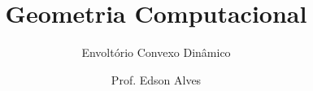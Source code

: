 \title{Geometria Computacional}
\subtitle{Envoltório Convexo Dinâmico}
\date{}
\author{Prof. Edson Alves}
